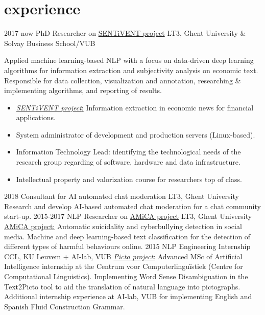 \documentclass[]{friggeri-cv-a4}
\begin{document}
\section{experience}
\begin{entrylist}
    \entry
        {2017-now}
        {PhD Researcher on \href{https://www.lt3.ugent.be/projects/event-extraction-and-sentiment-analysis-for-financ/}{SENTiVENT project}}
        {LT3, Ghent University \& Solvay Business School/VUB}
        {Applied machine learning-based NLP with a focus on data-driven deep learning algorithms for information extraction and subjectivity analysis on economic text. Responsible for data collection, visualization and annotation, researching \& implementing algorithms, and reporting of results.
        \begin{itemize}[leftmargin=*, labelsep*=1em]
            \item \href{https://www.lt3.ugent.be/projects/event-extraction-and-sentiment-analysis-for-financ/}{\emph{SENTiVENT project}:} Information extraction in economic news for financial applications.
            \item System administrator of development and production servers (Linux-based).
            \item Information Technology Lead: identifying the technological needs of the research group regarding of software, hardware and data infrastructure.
            \item Intellectual property and valorization course for researchers top of class. %
        \end{itemize}}
    \entry
        {2018}
        {Consultant for AI automated chat moderation}
        {LT3, Ghent University}
        {Research and develop AI-based automated chat moderation for a chat community start-up.}
    \entry
        {2015-2017}
        {NLP Researcher on \href{http://amicaproject.be/}{AMiCA project}}
        {LT3, Ghent University}
        {\href{http://amicaproject.be/}{AMiCA project:} Automatic suicidality and cyberbullying detection in social media. Machine and deep learning-based text classification for the detection of different types of harmful behaviours online.}
    \entry
        {2015}
        {NLP Engineering Internship}
        {CCL, KU Leuvem + AI-lab, VUB}
        {\href{http://picto.ccl.kuleuven.be/}{\emph{Picto project}:} Advanced MSc of Artificial Intelligence internship at the Centrum voor Computerlinguïstiek (Centre for Computational Linguistics). Implementing Word Sense Disambiguation in the Text2Picto tool to aid the translation of natural language into pictographs. Additional internship experience at AI-lab, VUB for implementing English and Spanish Fluid Construction Grammar.}
\end{entrylist}
\end{document}
